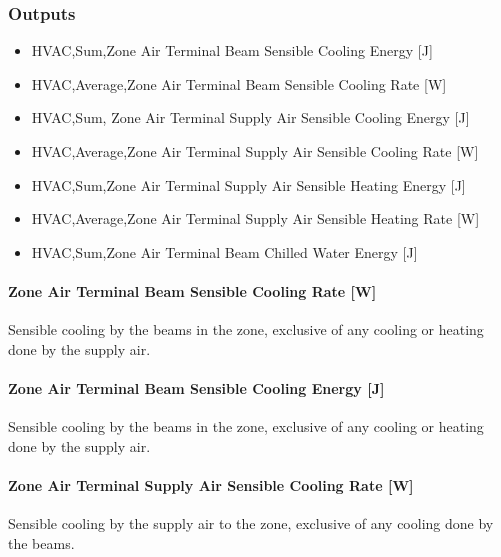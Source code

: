 \subsubsection{Outputs}\label{outputs-11}

\begin{itemize}
\item
  HVAC,Sum,Zone Air Terminal Beam Sensible Cooling Energy {[}J{]}
\item
  HVAC,Average,Zone Air Terminal Beam Sensible Cooling Rate {[}W{]}
\item
  HVAC,Sum, Zone Air Terminal Supply Air Sensible Cooling Energy {[}J{]}
\item
  HVAC,Average,Zone Air Terminal Supply Air Sensible Cooling Rate {[}W{]}
\item
  HVAC,Sum,Zone Air Terminal Supply Air Sensible Heating Energy {[}J{]}
\item
  HVAC,Average,Zone Air Terminal Supply Air Sensible Heating Rate {[}W{]}
\item
  HVAC,Sum,Zone Air Terminal Beam Chilled Water Energy {[}J{]}
\end{itemize}

\paragraph{Zone Air Terminal Beam Sensible Cooling Rate {[}W{]}}\label{zone-air-terminal-beam-sensible-cooling-rate-w-1}

Sensible cooling by the beams in the zone, exclusive of any cooling or heating done by the supply air.

\paragraph{Zone Air Terminal Beam Sensible Cooling Energy {[}J{]}}\label{zone-air-terminal-beam-sensible-cooling-energy-j-1}

Sensible cooling by the beams in the zone, exclusive of any cooling or heating done by the supply air.

\paragraph{Zone Air Terminal Supply Air Sensible Cooling Rate {[}W{]}}\label{zone-air-terminal-supply-air-sensible-cooling-rate-w}

Sensible cooling by the supply air to the zone, exclusive of any cooling done by the beams.

